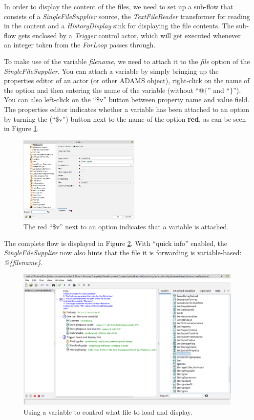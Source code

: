 In order to display the content of the files, we need to set up a sub-flow that
consists of a \textit{SingleFileSupplier} source, the \textit{TextFileReader}
transformer for reading in the content and a \textit{HistoryDisplay} sink for
displaying the file contents. The sub-flow gets enclosed by a \textit{Trigger}
control actor, which will get executed whenever an integer token from the
\textit{ForLoop} passes through.

To make use of the variable \textit{filename}, we need to attach it to the
\textit{file} option of the \textit{SingleFileSupplier}. You can attach a
variable by simply bringing up the properties editor of an actor (or other
ADAMS object), right-click on the name of the option and then entering the name
of the variable (without ``$@\{$'' and ``$\}$''). You can also left-click on the
``\$v'' button between property name and value field. The properties editor
indicates whether a variable has been attached to an option by turning the
(``\$v'') button next to the name of the option \textbf{red}, as can be seen in Figure
\ref{floweditor-variables1_flow-detail}.
\begin{figure}[htb]
  \centering
  \includegraphics[width=6.0cm]{images/floweditor-variables1_flow-detail.png}
  \caption{The red ``\$v'' next to an option indicates that a variable is
  attached.}
  \label{floweditor-variables1_flow-detail}
\end{figure}

The complete flow is displayed in Figure \ref{floweditor-variables1_flow}. With
``quick info'' enabled, the \textit{SingleFileSupplier} now also hints that the
file it is forwarding is variable-based: \textit{@\{filename\}}.
\begin{figure}[htb]
  \centering
  \includegraphics[width=12.0cm]{images/floweditor-variables1_flow.png}
  \caption{Using a variable to control what file to load and display.}
  \label{floweditor-variables1_flow}
\end{figure}

